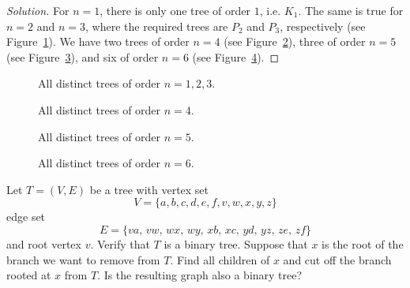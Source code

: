\begin{proof}[Solution]
For $n = 1$, there is only one tree of order $1$, i.e. $K_1$. The same
is true for $n = 2$ and $n = 3$, where the required trees are $P_2$
and $P_3$, respectively (see
Figure~\ref{fig:trees_forests:distinct_trees_specified_order_1_2_3}). We
have two trees of order $n = 4$ (see
Figure~\ref{fig:trees_forests:distinct_trees_specified_order_4}),
three of order $n = 5$ (see
Figure~\ref{fig:trees_forests:distinct_trees_specified_order_5}), and
six of order $n = 6$ (see
Figure~\ref{fig:trees_forests:distinct_trees_specified_order_6}).
\end{proof}

\begin{figure}[!htbp]
\centering

\caption{All distinct trees of order $n = 1, 2, 3$.}
\label{fig:trees_forests:distinct_trees_specified_order_1_2_3}
\end{figure}

\begin{figure}[!htbp]
\centering

\caption{All distinct trees of order $n = 4$.}
\label{fig:trees_forests:distinct_trees_specified_order_4}
\end{figure}

\begin{figure}[!htbp]
\centering

\caption{All distinct trees of order $n = 5$.}
\label{fig:trees_forests:distinct_trees_specified_order_5}
\end{figure}

\begin{figure}[!htbp]
\centering

\caption{All distinct trees of order $n = 6$.}
\label{fig:trees_forests:distinct_trees_specified_order_6}
\end{figure}

\begin{example}
\label{eg:trees_forests:branch_cut_binary_tree}
Let $T = (V, E)$ be a tree with vertex set
\[
V
=
\{a, b, c, d, e, f, v, w, x, y, z\}
\]
edge set
\[
E
=
\{va,\, vw,\, wx,\, wy,\, xb,\, xc,\, yd,\, yz,\, ze,\, zf\}
\]
and root vertex $v$. Verify that $T$ is a binary tree. Suppose that
$x$ is the root of the branch we want to remove from $T$. Find all
children of $x$ and cut off the branch rooted at $x$ from $T$. Is the
resulting graph also a binary tree?
\end{example}

